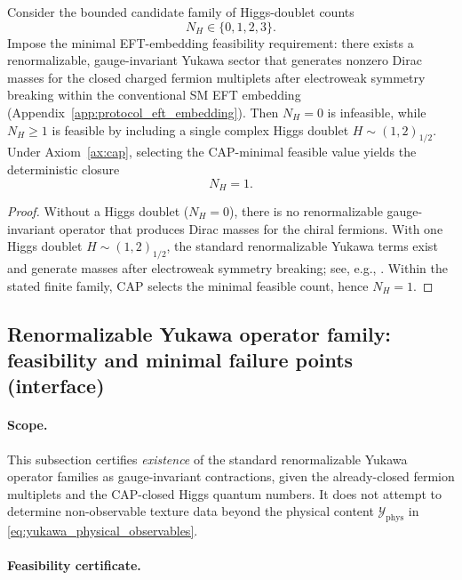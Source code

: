 \begin{proposition}\label{prop:minimal_higgs_doublet_count}
Consider the bounded candidate family of Higgs-doublet counts
\[
N_H\in\{0,1,2,3\}.
\]
\InterfaceTag Impose the minimal EFT-embedding feasibility requirement: there exists a renormalizable, gauge-invariant Yukawa sector that generates nonzero Dirac masses for the closed charged fermion multiplets after electroweak symmetry breaking within the conventional SM EFT embedding (Appendix~\ref{app:protocol_eft_embedding}).
Then $N_H=0$ is infeasible, while $N_H\ge 1$ is feasible by including a single complex Higgs doublet $H\sim (1,2)_{1/2}$.
Under Axiom~\ref{ax:cap}, selecting the CAP-minimal feasible value yields the deterministic closure
\[
N_H=1.
\]
\end{proposition}
\begin{proof}
Without a Higgs doublet ($N_H=0$), there is no renormalizable gauge-invariant operator that produces Dirac masses for the chiral fermions.
With one Higgs doublet $H\sim(1,2)_{1/2}$, the standard renormalizable Yukawa terms exist and generate masses after electroweak symmetry breaking; see, e.g., \cite{PeskinSchroeder1995,PDGRPP2024}.
Within the stated finite family, CAP selects the minimal feasible count, hence $N_H=1$.
\end{proof}

\subsection{Renormalizable Yukawa operator family: feasibility and minimal failure points (interface)}
\label{subsec:yukawa_operator_family_feasibility}

\paragraph{Scope.}
\AuditTag This subsection certifies \emph{existence} of the standard renormalizable Yukawa operator families as gauge-invariant contractions, given the already-closed fermion multiplets and the CAP-closed Higgs quantum numbers.
It does not attempt to determine non-observable texture data beyond the physical content $\mathcal{Y}_{\mathrm{phys}}$ in \eqref{eq:yukawa_physical_observables}.

\paragraph{Feasibility certificate.}
%

